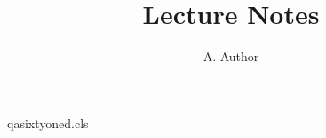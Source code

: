 \begin{filecontents*}[overwrite]{qasixtyoned.cls}
\newcommand\altmail[1]{\gdef\@altmail{#1}}
\newcommand\phone[1]{\gdef\@phone{#1}}
\newcommand\mail[1]{\gdef\@mail{#1}}
\renewcommand\@maketitle{\begin{center}{\LARGE \@title\par}{\large \@author\par}\end{center}
  \textbf{E-mail:} \texttt{\@altmail} \@phone\par
  \textbf{E-mail:} \texttt{\@mail}.\par}
\end{filecontents*}
\documentclass{qasixtyoned}
\title{Lecture Notes}
\author{A. Author}

\maketitle
Text.

